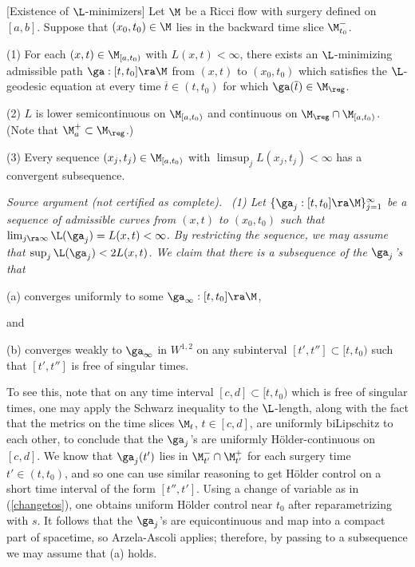 \begin{lemma}
  \label{lem:kl-reduced-l-geometry-existence-ricci-flow-surgery}
[Existence of $\L$-minimizers]
\label{minimizersexist}
Let $\M$ be a Ricci flow with surgery
defined on $ [a,b]$. Suppose that $(x_0,t_0)\in \M$ lies in the backward
time slice $\M_{t_0}^-$.

(1) For each $(x,t)\in \M_{[a,t_0)}$ with $L(x,t)<\infty$, there exists
an $\L$-minimizing admissible path $\ga:[t,t_0]\ra\M$ from $(x,t)$ to $(x_0,t_0)$
which satisfies the
$\L$-geodesic equation at every time $\overline{t}\in (t,t_0)$ for which
$\ga(\overline{t})\in\M_{\reg}$.


(2) $L$ is lower semicontinuous on
$\M_{[a,t_0)}$
and continuous
on
$\M_{\reg}\cap \M_{[a,t_0)}$. (Note that $\M_a^+ \subset \M_{\reg}$.)

(3) Every sequence $(x_j,t_j)\in \M_{[a,t_0)}$ with $\limsup_j L(x_j,t_j)<\infty$
has  a convergent subsequence.
\end{lemma}
\par\medskip\noindent\textit{Source argument (not certified as complete).}\ \begingroup\itshape
(1)   Let
$\{\ga_j:[t,t_0]\ra\M\}_{j=1}^\infty$ be a sequence of
admissible curves from $(x,t)$ to $(x_0,t_0)$ such that
$\lim_{j\ra\infty}\L(\ga_j)=L(x,t)<\infty$. By restricting the sequence,
we may assume that
$\sup_j \L(\ga_j)<2L(x,t)$.
We claim that there is
a subsequence of the $\ga_j$'s  that

(a) converges uniformly to some $\ga_\infty:[t,t_0]\ra\M$,

and

(b) converges weakly to $\ga_\infty$ in $W^{1,2}$ on any  subinterval
$[t',t'']\subset [t,t_0)$ such that $[t',t'']$ is free of singular times.

\noindent
To see this, note that on any time interval $[c,d]\subset [t,t_0)$
which is free of singular times, one may apply the Schwarz inequality
to the $\L$-length, along with the fact that the metrics on the time
slices $\M_t$, $t \in [c,d]$, are uniformly biLipschitz to each other,
to conclude that the $\ga_j$'s are uniformly
H\"older-continuous on $[c,d]$.  We know
that $\ga_j(t')$ lies in $\M_{t'}^-\cap \M_{t'}^+$ for each surgery
time $t'\in (t,t_0)$, and so one can use similar reasoning to get
H\"older control on a short time interval of the form $[t'',t']$.
Using a change of variable as in  (\ref{changetos}), one obtains
uniform H\"older control near $t_0$ after reparametrizing with $s$.
It follows that the $\ga_j$'s are equicontinuous and map into a
compact part of spacetime,  so
Arzela-Ascoli applies;  therefore, by passing  to a subsequence we
may assume  that (a) holds.

